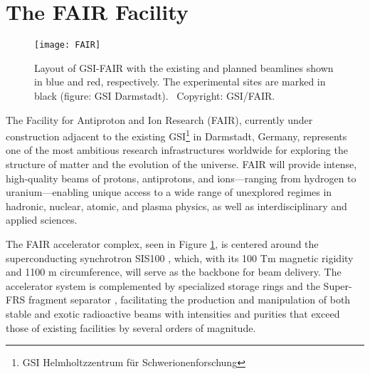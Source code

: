\section{The FAIR Facility}


\begin{figure}
	\centering
	\texttt{[image: FAIR]}
	\caption{Layout of GSI-FAIR with the existing and planned beamlines shown in blue and red, respectively. The experimental sites are marked in black (figure: GSI Darmstadt). \textcopyright ~Copyright: GSI/FAIR.}
	\label{fig:FAIRlayout}
\end{figure}


The Facility for Antiproton and Ion Research (FAIR), currently under construction adjacent to the existing GSI\footnote{GSI Helmholtzzentrum für Schwerionenforschung} in Darmstadt, Germany, represents one of the most ambitious research infrastructures worldwide for exploring the structure of matter and the evolution of the universe. FAIR will provide intense, high-quality beams of protons, antiprotons, and ions—ranging from hydrogen to uranium—enabling unique access to a wide range of unexplored regimes in hadronic, nuclear, atomic, and plasma physics, as well as interdisciplinary and applied sciences.

The FAIR accelerator complex, seen in Figure \ref{fig:FAIRlayout}, is centered around the superconducting synchrotron SIS100 \cite{sis100_fair_2020}, which, with its 100 Tm magnetic rigidity and 1100 m circumference, will serve as the backbone for beam delivery. The accelerator system is complemented by specialized storage rings and the Super-FRS fragment separator \cite{superfrs_status_2008}, facilitating the production and manipulation of both stable and exotic radioactive beams with intensities and purities that exceed those of existing facilities by several orders of magnitude.

